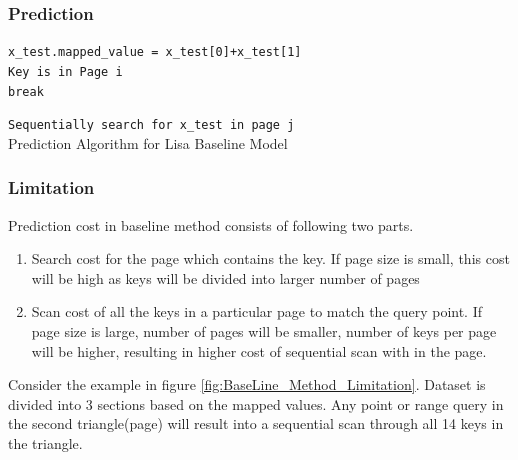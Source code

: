 \subsubsection{Prediction}

\begin{algorithm}[H]
    \SetAlgoLined
    \texttt{x\_test.mapped\_value = x\_test[0]+x\_test[1] } \\
    {
        {
		    \texttt{Key is in Page i } \\
		    \texttt{break }
		}
    }
  
 	 \texttt{Sequentially search for x\_test in page j} \\
     \caption{Prediction Algorithm for Lisa Baseline Model }
\end{algorithm}

\subsubsection{Limitation}
Prediction cost in baseline method consists of following two parts.

\begin{enumerate}
	\item Search cost for the page which contains the key. If page size is small, this cost will be high as keys will be divided into larger number of pages
	\item Scan cost of all the keys in a particular page to match the query point. If page size is large, number of pages will be smaller, number of keys per page will be higher, resulting in higher cost of sequential scan with in the page. 
\end{enumerate}
Consider the example in figure \ref{fig:BaseLine_Method_Limitation}. Dataset is divided into 3 sections based on the mapped values. Any point or range query in the second triangle(page) will result into a sequential scan through all 14 keys in the triangle.   

